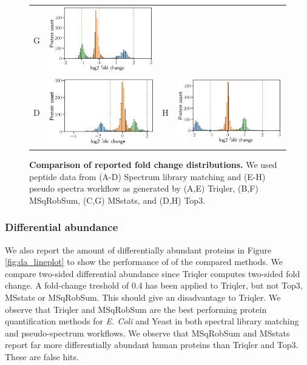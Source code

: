 \documentclass[10pt,letterpaper]{article}
\begin{document}
\begin{figure}[hbt]
\begin{tabular}{lclc}
        G & \includegraphics[width=0.4\linewidth]{../../result/report_plots/diann_msstats_intensity.png} \\ 
        D & \includegraphics[width=0.4\linewidth]{../../result/report_plots/osw_top3_intensity.png} &
        H & \includegraphics[width=0.4\linewidth]{../../result/report_plots/diann_top3_intensity.png} 
    \end{tabular}
    \caption{{\bf Comparison of reported fold change distributions.} We used peptide data from (A-D) Spectrum library matching and (E-H) pseudo spectra workflow as generated by 
    (A,E) Triqler, (B,F) MSqRobSum, (C,G) MSstats, and (D,H) Top3. \label{fig:fc_histogram}}
\end{figure}


\subsubsection*{Differential abundance}

We also report the amount of differentially abundant proteins in Figure \ref{fig:da_lineplot} to show the performance of of the compared methods. We compare two-sided differential abundance since Triqler computes two-sided fold change. A fold-change treshold of 0.4 has been applied to Triqler, but not Top3, MSstats or MSqRobSum. This should give an disadvantage to Triqler. We observe that Triqler and MSqRobSum are the best performing protein quantification methods for {\em E. Coli} and Yeast in both spectral library matching and pseudo-spectrum workflows. We observe that MSqRobSum and MSstats report far more differentially abundant human proteins than Triqler and Top3. These are false hits.   
\end{document}
